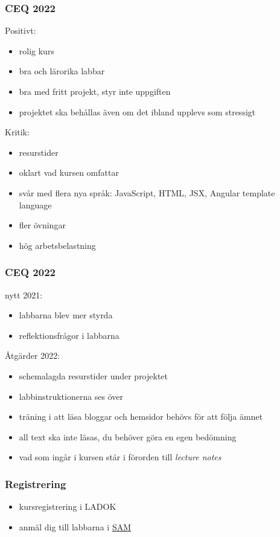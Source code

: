 \documentclass[aspectratio=1610]{beamer}
\begin{document}
\begin{frame}
  \frametitle{CEQ 2022}
Positivt:
\begin{itemize}
  \item rolig kurs
  \item bra och lärorika labbar
  \item bra med fritt projekt, styr inte uppgiften
  \item projektet ska behållas även om det ibland upplevs som stressigt
\end{itemize}
\vspace{2mm}
Kritik:
\begin{itemize}
  \item resurstider
  \item oklart vad kursen omfattar
  \item svår med flera nya språk: JavaScript, HTML, JSX, Angular template language
  \item fler övningar
  \item hög arbetsbelastning
\end{itemize}
\end{frame}

\begin{frame}
  \frametitle{CEQ 2022}
nytt 2021:
\begin{itemize}
  \item labbarna blev mer styrda
  \item reflektionsfrågor i labbarna
\end{itemize}
Åtgärder 2022:
\begin{itemize}
  \item schemalagda resurstider under projektet
  \item labbinstruktionerna ses över
  \item träning i att läsa bloggar och hemsidor behövs för att följa ämnet
  \item all text ska inte läsas, du behöver göra en egen bedömning
  \item vad som ingår i kursen står i förorden till \emph{lecture notes}
\end{itemize}
\end{frame}

\begin{frame}
  \frametitle{Registrering}
\begin{itemize}
  \item kursregistrering i LADOK
  \item anmäl dig till labbarna i \href{https://sam.cs.lth.se/Labs}{SAM}
\end{itemize}

\end{frame}

\begin{frame}[plain]
  \endpage
\end{frame}

\end{document}
